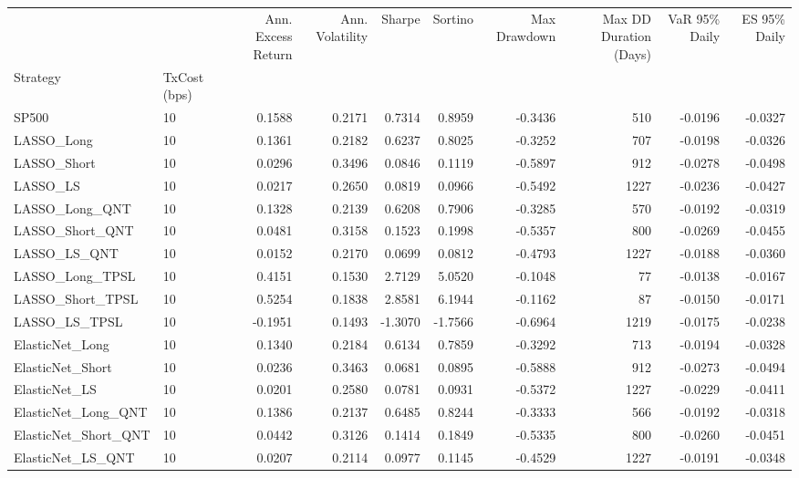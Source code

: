 \begin{tabular}{llrrrrrrrr}
\toprule
 &  & Ann. Excess Return & Ann. Volatility & Sharpe & Sortino & Max Drawdown & Max DD Duration (Days) & VaR 95\% Daily & ES 95\% Daily \\
Strategy & TxCost (bps) &  &  &  &  &  &  &  &  \\
\midrule
SP500 & 10 & 0.1588 & 0.2171 & 0.7314 & 0.8959 & -0.3436 & 510 & -0.0196 & -0.0327 \\
\cline{1-10}
LASSO\_Long & 10 & 0.1361 & 0.2182 & 0.6237 & 0.8025 & -0.3252 & 707 & -0.0198 & -0.0326 \\
\cline{1-10}
LASSO\_Short & 10 & 0.0296 & 0.3496 & 0.0846 & 0.1119 & -0.5897 & 912 & -0.0278 & -0.0498 \\
\cline{1-10}
LASSO\_LS & 10 & 0.0217 & 0.2650 & 0.0819 & 0.0966 & -0.5492 & 1227 & -0.0236 & -0.0427 \\
\cline{1-10}
LASSO\_Long\_QNT & 10 & 0.1328 & 0.2139 & 0.6208 & 0.7906 & -0.3285 & 570 & -0.0192 & -0.0319 \\
\cline{1-10}
LASSO\_Short\_QNT & 10 & 0.0481 & 0.3158 & 0.1523 & 0.1998 & -0.5357 & 800 & -0.0269 & -0.0455 \\
\cline{1-10}
LASSO\_LS\_QNT & 10 & 0.0152 & 0.2170 & 0.0699 & 0.0812 & -0.4793 & 1227 & -0.0188 & -0.0360 \\
\cline{1-10}
LASSO\_Long\_TPSL & 10 & 0.4151 & 0.1530 & 2.7129 & 5.0520 & -0.1048 & 77 & -0.0138 & -0.0167 \\
\cline{1-10}
LASSO\_Short\_TPSL & 10 & 0.5254 & 0.1838 & 2.8581 & 6.1944 & -0.1162 & 87 & -0.0150 & -0.0171 \\
\cline{1-10}
LASSO\_LS\_TPSL & 10 & -0.1951 & 0.1493 & -1.3070 & -1.7566 & -0.6964 & 1219 & -0.0175 & -0.0238 \\
\cline{1-10}
ElasticNet\_Long & 10 & 0.1340 & 0.2184 & 0.6134 & 0.7859 & -0.3292 & 713 & -0.0194 & -0.0328 \\
\cline{1-10}
ElasticNet\_Short & 10 & 0.0236 & 0.3463 & 0.0681 & 0.0895 & -0.5888 & 912 & -0.0273 & -0.0494 \\
\cline{1-10}
ElasticNet\_LS & 10 & 0.0201 & 0.2580 & 0.0781 & 0.0931 & -0.5372 & 1227 & -0.0229 & -0.0411 \\
\cline{1-10}
ElasticNet\_Long\_QNT & 10 & 0.1386 & 0.2137 & 0.6485 & 0.8244 & -0.3333 & 566 & -0.0192 & -0.0318 \\
\cline{1-10}
ElasticNet\_Short\_QNT & 10 & 0.0442 & 0.3126 & 0.1414 & 0.1849 & -0.5335 & 800 & -0.0260 & -0.0451 \\
\cline{1-10}
ElasticNet\_LS\_QNT & 10 & 0.0207 & 0.2114 & 0.0977 & 0.1145 & -0.4529 & 1227 & -0.0191 & -0.0348 \\

\end{tabular}
